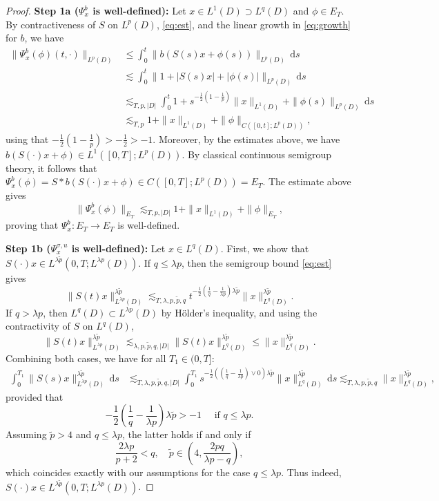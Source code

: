 \documentclass{amsart}
\theoremstyle{plain}
\theoremstyle{remark}
\theoremstyle{plain}
\numberwithin{equation}{section}
\newcommand{\col}{\colon}
\newcommand{\dd}{\,\mathrm{d}}
\begin{document}
\begin{proof}  
\textbf{Step 1a ($\Psi_x^b$ is well-defined):}
Let $x \in L^1(D) \supset L^q(D)$ and $\phi \in E_T$. By contractiveness of $S$ on $L^p(D)$, \eqref{eq:est}, and the linear growth in \eqref{eq:growth} for $b$, we have  
\begin{align*}
\|\Psi_x^b(\phi)(t,\cdot)\|_{L^p(D)}
&\leq   \int_0^t  \|b(S(s)x+\phi(s))\|_{L^p(D)}\dd s \\
&\lesssim \int_0^t  \|1+|S(s) x| + |\phi(s)|\|_{L^p(D)}\dd s\\
&\lesssim_{T,p,|D|}\int_0^t  1+ s^{-\frac12(1-\frac1p)}\|x\|_{L^1(D)}+\|\phi(s)\|_{L^p(D)} \dd s\\
&\lesssim_{T,p}  1 +   \|x\|_{L^1(D)} +  \|\phi\|_{C([0,t];L^p(D))},
\end{align*}  
using that $-\frac12(1-\frac1p)>-\frac12>-1$. 
Moreover, by the estimates above, we have $b(S(\cdot)x+\phi)\in L^1([0,T];L^{p}(D))$. By classical continuous semigroup theory, it follows that $\Psi_x^b(\phi)=S*b(S(\cdot)x+\phi)\in C([0,T];L^p(D))= E_T$.  
The estimate above gives
\[
\|\Psi_x^b(\phi)\|_{E_T}\lesssim_{T,p,|D|}1 +   \|x\|_{L^1(D)} +  \|\phi\|_{E_T}, 
\]
proving that $\Psi_x^b\col E_T\to E_T$ is well-defined. 

\textbf{Step 1b ($\Psi_x^{\sigma,u}$ is well-defined):} 
Let $x\in L^q(D)$. First, we show that $S(\cdot)x\in L^{\lambda \tilde p}(0,T;L^{\lambda p}(D))$. 
If $q \leq \lambda p$, then the semigroup bound  \eqref{eq:est} gives 
\[
\|S(t)x\|_{L^{\lambda p}(D)}^{\lambda\tilde p} \lesssim_{T,\lambda, p,\tilde p,q} t^{-\frac{1}{2} (\frac{1}{q}-\frac{1}{\lambda p}) \lambda \tilde{p}}\|x\|_{L^q(D)}^{\lambda\tilde p}.
\]
If $q> \lambda p$, then $L^q(D)\subset L^{\lambda {p}}(D)$ by H\"older's inequality, and using   the contractivity of $S$ on $L^q(D)$,  
\[\|S(t) x\|_{L^{\lambda p}(D)}^{\lambda\tilde p} \lesssim_{\lambda,p,\tilde p, q,|D|} 
\|S(t) x\|_{L^{q}(D)}^{\lambda\tilde p}\leq 
\|x\|_{L^{q}(D)}^{\lambda\tilde p}.\]
Combining both cases, we have for all $T_1\in(0,T]$:
\begin{align}\label{eq:Sx Lp}
\int_0^{T_1}\|S(s)x\|_{L^{\lambda p}(D)}^{\lambda \tilde p}\dd s 
&\lesssim_{T,\lambda,p,\tilde p,q,|D|}\int_0^{T_1}s^{-\frac12((\frac1q-\frac{1}{\lambda p})\vee 0)\lambda \tilde p}\|x\|_{L^{q}(D)}^{\lambda \tilde p}\dd s \lesssim_{T,\lambda,p,\tilde p,q} \|x\|_{L^q(D)}^{\lambda\tilde p},
\end{align} 
provided that  
\[
-\frac12(\frac{1}{q}-\frac{1}{\lambda p})\lambda\tilde p >-1 \quad\text{ if } q\leq \lambda p.
\]
Assuming $\tilde p>4$ and $q\leq\lambda p$, the latter holds if and only if 
\[ 
\frac{2\lambda p}{p+2}<q,  \quad \tilde{p}\in(4,\frac{2pq}{ \lambda p-q}),
\] which coincides exactly with our assumptions for the case $q\leq\lambda p$.
Thus indeed,  $S(\cdot)x\in L^{\lambda \tilde p}(0,T;L^{\lambda p}(D))$. 


\end{proof}
\end{document}
